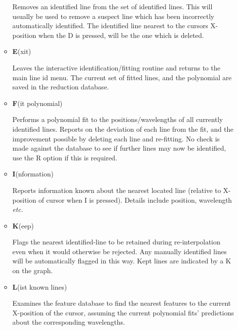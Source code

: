\documentclass[11pt,twoside]{article}
\newcommand{\sunspec}[2]{#1}
\renewcommand{\sunspec}[2]{#2}
\newcommand{\myindex}[1]{\index{#1}}
\renewcommand{\myindex}[1]{}
\begin{document}
\begin{itemize}
\begin{itemize}
            Removes an identified line from
            the set of identified lines. This will usually be used to
            remove a suspect line which has been incorrectly automatically
            identified. The identified line nearest to the cursors
            X-position when the D is pressed,  will be the one which is
            deleted.

      \item {\sunspec{\Large\tt}{\bf} E}(xit)

            Leaves the interactive
            identification/fitting routine and returns to the main line id
            menu. The current set of fitted lines,  and the polynomial are
            saved in the reduction database.

      \item {\sunspec{\Large\tt}{\bf} F}(it polynomial)

            Performs a polynomial fit to
            the positions/wavelengths of all currently identified lines.
            Reports on the deviation of each line from the fit,  and the
            improvement possible by deleting each line and re-fitting. No
            check is made against the database to see if further lines may
            now be identified, use the R option if this is required.

      \item {\sunspec{\Large\tt}{\bf} I}(nformation)

            Reports information known about
            the nearest located line (relative to X-position of cursor when
            I is pressed). Details include position, wavelength {\it etc.}

      \item {\sunspec{\Large\tt}{\bf} K}(eep)

            Flags the nearest identified-line to
            be retained during re-interpolation even when it
            would otherwise be rejected. Any manually identified lines will
            be automatically flagged in this way. Kept lines are indicated
            by a K on the graph.

      \item {\sunspec{\Large\tt}{\bf} L}(ist known lines)
            \myindex{Arc fitting!list known lines}

            Examines the feature database
            to find the nearest features to the current X-position of the
            cursor,  assuming the current polynomial fits' predictions
            about the corresponding wavelengths.


\end{itemize}
\end{itemize}
\end{document}
